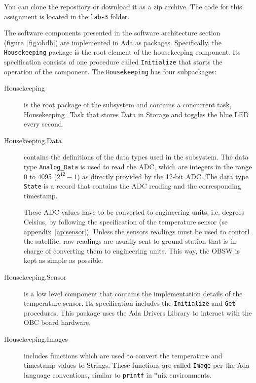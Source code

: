 \begin{center}
	\begin{tcolorbox}[width=0.6\textwidth,
		boxsep=0pt,
		left=0pt,
		right=0pt,
		top=5pt,
		]
		\centering
	\end{tcolorbox}
\end{center}
 
You can clone the repository or download it as a zip archive.
The code for this assignment is located in the \textcolor{mPurple}{\texttt{lab-3}} folder.

The software components presented in the software architecture section
(figure~\ref{fig:obdh})
are implemented in Ada as packages.
Specifically, the \texttt{Housekeeping} package is the root element of the housekeeping
component.
Its specification consists of one procedure called \texttt{Initialize}
that starts the operation of the component.
The \texttt{Housekeeping} has four subpackages:

\begin{description}
\item[Housekeeping] is the root package of the subsystem and contains a concurrent task, Housekeeping\_Task that stores Data in Storage and toggles the blue LED every second.

\item[Housekeeping.Data] contains the definitions of the data types used in the subsystem. The data type \texttt{Analog\_Data} is used to read the ADC, which are integers in the range 0 to 4095 ($2^{12}-1$) as directly provided by the 12-bit ADC.
The data type \texttt{State} is a record that contains the ADC reading and the corresponding timestamp.

These ADC values have to be converted to engineering units. i.e. degrees Celsius, by following the specification of the temperature sensor (se appendix~\ref{ap:sensor}).
Unless the sensors readings must be used to contorl the satellite,
raw readings are usually sent to ground station
that is in charge of converting them to engineering units.
This way, the OBSW is kept as simple as possible.

\item[Housekeeping.Sensor]  is a low level component
that contains the implementation details of the temperature sensor.
Its specification includes the \texttt{Initialize} and \texttt{Get} procedures.
This package uses the Ada Drivers Library to interact with the OBC board hardware.

\item[Housekeeping.Images] includes functions which are used to convert the temperature and timestamp values to Strings. These functions are called \texttt{Image} per the Ada language conventions,
similar to \texttt{printf} in $\ast$nix environments.
\end{description}

